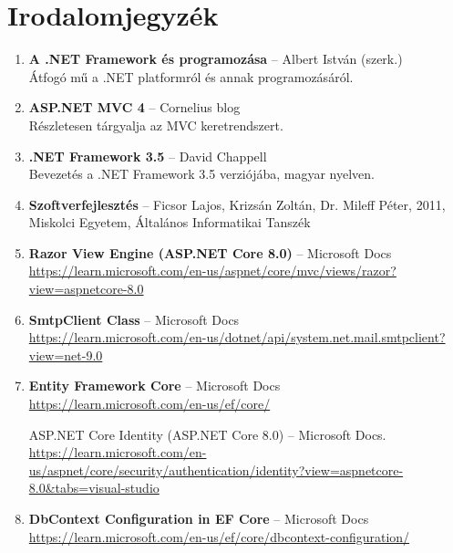 \section*{Irodalomjegyzék}

\begin{enumerate}
    \item \label{ref:albert_dotnet} \textbf{A .NET Framework és programozása} – Albert István (szerk.)\\
    Átfogó mű a .NET platformról és annak programozásáról.

    \item \label{ref:cornelius_mvc} \textbf{ASP.NET MVC 4} – Cornelius blog\\
    Részletesen tárgyalja az MVC keretrendszert. 

    \item \label{ref:chappell_dotnet} \textbf{.NET Framework 3.5} – David Chappell\\
    Bevezetés a .NET Framework 3.5 verziójába, magyar nyelven.

    \item \label{ref:ficsor_szoftver} \textbf{Szoftverfejlesztés} – Ficsor Lajos, Krizsán Zoltán, Dr. Mileff Péter, 2011, Miskolci Egyetem, Általános Informatikai Tanszék

    \item \label{ref:razor_docs} \textbf{Razor View Engine (ASP.NET Core 8.0)} – Microsoft Docs\\
    \url{https://learn.microsoft.com/en-us/aspnet/core/mvc/views/razor?view=aspnetcore-8.0}

    \item \label{ref:smtp_client} \textbf{SmtpClient Class} – Microsoft Docs\\
    \url{https://learn.microsoft.com/en-us/dotnet/api/system.net.mail.smtpclient?view=net-9.0}

    \item \label{ref:ef_core} \textbf{Entity Framework Core} – Microsoft Docs\\
    \url{https://learn.microsoft.com/en-us/ef/core/}

    ASP.NET Core Identity (ASP.NET Core 8.0) – Microsoft Docs.\\
    \url{https://learn.microsoft.com/en-us/aspnet/core/security/authentication/identity?view=aspnetcore-8.0&tabs=visual-studio}


    \item \label{ref:ef_dbcontext} \textbf{DbContext Configuration in EF Core} – Microsoft Docs\\
    \url{https://learn.microsoft.com/en-us/ef/core/dbcontext-configuration/}


\end{enumerate}
